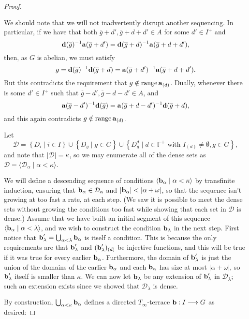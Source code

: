 \documentclass[12pt,a4paper]{article}
\newcommand{\F}{\mathbb{F}}
\DeclareMathOperator{\ran}{range}
\newcommand{\To}{\longrightarrow}
\newcommand{\st}{\; | \;}
\newcommand{\set}[2]{\left\{#1\st #2 \right\}}
\newcommand{\seq}[2]{\langle #1 \st #2 \rangle}
\renewcommand{\a}{\textup{\textbf{a}}}
\renewcommand{\b}{\textup{\textbf{b}}}
\renewcommand{\d}{\textup{\textbf{d}}}
\begin{document}
\begin{proof}
\begin{enumerate}
We should note that we will not inadvertently disrupt another sequencing. In particular, if we have that both $\overline g+d', \overline g+d+d'\in A$ for some $d'\in I^+$ and $$\d(\overline g)^{-1}\a(\overline g+d') = \d(\overline g+d)^{-1}\a(\overline g+d+d'),$$ then, as $G$ is abelian, we must satisfy $$g= \d(\overline g)^{-1}\d(\overline g+d) = \a(\overline g+d')^{-1}\a(\overline g+d+d').$$ But this contradicts the requirement that $g \notin \ran \a_{(d)}$. Dually, whenever there is some $d'\in I^+$ such that $\overline g-d', \overline g-d-d' \in A$, and $$\a(\overline g-d')^{-1}\d(\overline g) = \a(\overline g+d-d')^{-1}\d(\overline g+d),$$ and this again contradicts $g \notin \ran \a_{(d)}$.
\end{enumerate}

Let $$\mathcal D = \set{D_i}{i\in I} \cup \set{D_g}{g\in G} \cup \set{D^d_g}{d \in \F^+\text{ with } I_{(d)}\neq \emptyset, g \in G},$$ and note that $|\mathcal D|=\kappa$, so we may enumerate all of the dense sets as $\mathcal D = \seq{\mathcal D_\alpha}{\alpha<\kappa}$.

We will define a descending sequence of conditions $\seq{\b_\alpha}{\alpha<\kappa}$ by transfinite induction, ensuring that $\b_\alpha\in \mathcal D_\alpha$ and $|\b_\alpha|<|\alpha+\omega|$, so that the sequence isn't growing at too fast a rate, at each step. (We saw it is possible to meet the dense sets without growing the conditions too fast while showing that each set in $\mathcal D$ is dense.) Assume that we have built an initial segment of this sequence $\seq{\b_\alpha}{\alpha<\lambda}$, and we wish to construct the condition $\b_\lambda$ in the next step. First notice that $\b_\lambda'=\bigcup_{\alpha<\lambda}\b_\alpha$ is itself a condition. This is because the only requirements are that $\b_\lambda'$ and $(\b_\lambda')_{(d)}$ be injective functions, and this
will be true if it was true for every earlier $\b_\alpha$. Furthermore, the domain of $\b_\lambda'$ is just the union of the domains of the earlier $\b_\alpha$ and each $\b_\alpha$ has size at most $|\alpha+\omega|$, 
so $\b_\lambda'$ itself is smaller than $\kappa$. %
We can now let $\b_\lambda$ be any extension of $\b_\lambda'$ in $\mathcal{D}_\lambda$; such an extension exists since we showed that
$\mathcal{D}_\lambda$ is dense.

By construction, $\bigcup_{\alpha<\kappa}\b_\alpha$ defines a directed $T_\infty$-terrace $\b: I \To G$ as desired:


\end{proof}
\end{document}
